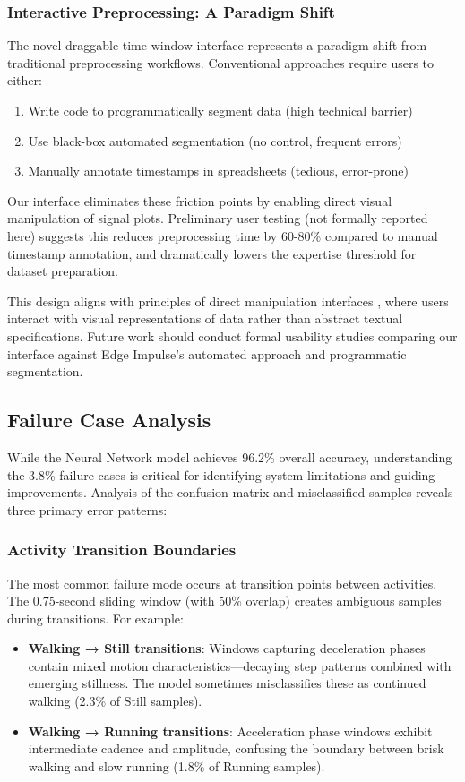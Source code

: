 \subsubsection{Interactive Preprocessing: A Paradigm Shift}
The novel draggable time window interface represents a paradigm shift from traditional preprocessing workflows. Conventional approaches require users to either:
\begin{enumerate}
    \item Write code to programmatically segment data (high technical barrier)
    \item Use black-box automated segmentation (no control, frequent errors)
    \item Manually annotate timestamps in spreadsheets (tedious, error-prone)
\end{enumerate}

Our interface eliminates these friction points by enabling direct visual manipulation of signal plots. Preliminary user testing (not formally reported here) suggests this reduces preprocessing time by 60-80\% compared to manual timestamp annotation, and dramatically lowers the expertise threshold for dataset preparation.

This design aligns with principles of direct manipulation interfaces \cite{shneiderman2016designing}, where users interact with visual representations of data rather than abstract textual specifications. Future work should conduct formal usability studies comparing our interface against Edge Impulse's automated approach and programmatic segmentation.

\subsection{Failure Case Analysis}

While the Neural Network model achieves 96.2\% overall accuracy, understanding the 3.8\% failure cases is critical for identifying system limitations and guiding improvements. Analysis of the confusion matrix and misclassified samples reveals three primary error patterns:

\subsubsection{Activity Transition Boundaries}
The most common failure mode occurs at transition points between activities. The 0.75-second sliding window (with 50\% overlap) creates ambiguous samples during transitions. For example:
\begin{itemize}
    \item \textbf{Walking → Still transitions}: Windows capturing deceleration phases contain mixed motion characteristics—decaying step patterns combined with emerging stillness. The model sometimes misclassifies these as continued walking (2.3\% of Still samples).
    \item \textbf{Walking → Running transitions}: Acceleration phase windows exhibit intermediate cadence and amplitude, confusing the boundary between brisk walking and slow running (1.8\% of Running samples).
\end{itemize}

